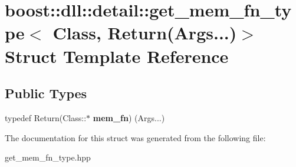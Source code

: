 \hypertarget{a01416}{}\section{boost\+:\+:dll\+:\+:detail\+:\+:get\+\_\+mem\+\_\+fn\+\_\+type$<$ Class, Return(Args...)$>$ Struct Template Reference}
\label{a01416}
\subsection*{Public Types}
\begin{DoxyCompactItemize}
\item 
\mbox{\label{a01416_a3d6cbb182b6bed192344f19d67769667}} 
typedef Return(Class\+::$\ast$ {\bfseries mem\+\_\+fn}) (Args...)
\end{DoxyCompactItemize}


The documentation for this struct was generated from the following file\+:\begin{DoxyCompactItemize}
\item 
get\+\_\+mem\+\_\+fn\+\_\+type.\+hpp\end{DoxyCompactItemize}

